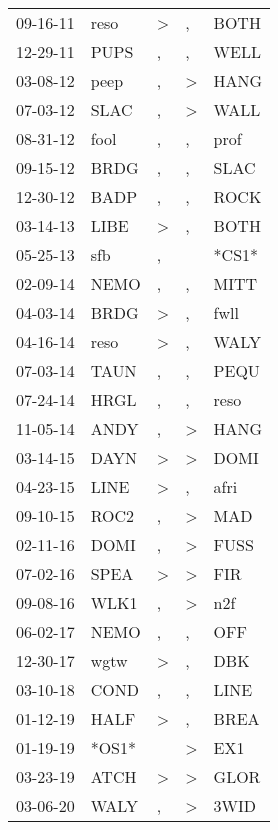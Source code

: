 \begin{supertabular}{lllll}
 09-16-11 &   reso &     \textgreater &                , &   BOTH \\
 12-29-11 &   PUPS &                , &                , &   WELL \\
 03-08-12 &   peep &                , &     \textgreater &   HANG \\
 07-03-12 &   SLAC &                , &     \textgreater &   WALL \\
 08-31-12 &   fool &                , &                , &   prof \\
 09-15-12 &   BRDG &                , &                , &   SLAC \\
 12-30-12 &   BADP &                , &                , &   ROCK \\
 03-14-13 &   LIBE &     \textgreater &                , &   BOTH \\
 05-25-13 &    sfb &                , &                  &  *CS1* \\
 02-09-14 &   NEMO &                , &                , &   MITT \\
 04-03-14 &   BRDG &     \textgreater &                , &   fwll \\
 04-16-14 &   reso &     \textgreater &                , &   WALY \\
 07-03-14 &   TAUN &                , &                , &   PEQU \\
 07-24-14 &   HRGL &                , &                , &   reso \\
 11-05-14 &   ANDY &                , &     \textgreater &   HANG \\
 03-14-15 &   DAYN &     \textgreater &     \textgreater &   DOMI \\
 04-23-15 &   LINE &     \textgreater &                , &   afri \\
 09-10-15 &   ROC2 &                , &     \textgreater &    MAD \\
 02-11-16 &   DOMI &                , &     \textgreater &   FUSS \\
 07-02-16 &   SPEA &     \textgreater &     \textgreater &    FIR \\
 09-08-16 &   WLK1 &                , &     \textgreater &    n2f \\
 06-02-17 &   NEMO &                , &                , &    OFF \\
 12-30-17 &   wgtw &     \textgreater &                , &    DBK \\
 03-10-18 &   COND &                , &                , &   LINE \\
 01-12-19 &   HALF &     \textgreater &                , &   BREA \\
 01-19-19 &  *OS1* &                  &     \textgreater &    EX1 \\
 03-23-19 &   ATCH &     \textgreater &     \textgreater &   GLOR \\
 03-06-20 &   WALY &                , &     \textgreater &   3WID \\
\end{supertabular}
